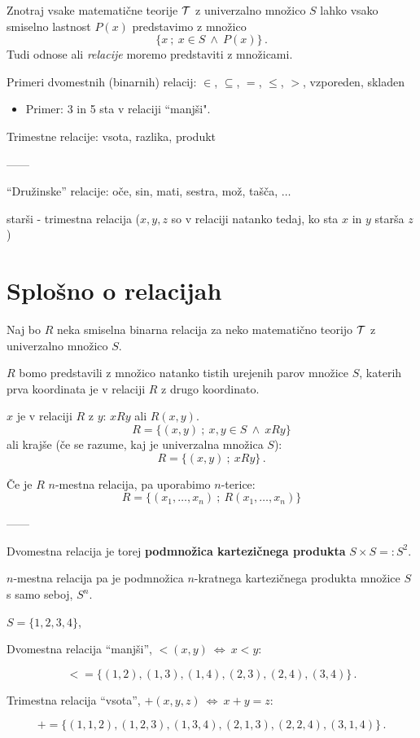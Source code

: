 \documentclass[11pt,paper=b5,footinclude,headinclude]{scrbook} %
\newcounter{example}
\def\inn {{~\wedge~}}
\def\cee {{~\Leftrightarrow~}}
\begin{document}
Znotraj vsake matematične teorije ${\cal T}$ z univerzalno množico $S$
lahko vsako smiselno lastnost $P(x)$ predstavimo z množico
$$\{x~;~x\in S\inn P(x)\}\,.$$
Tudi odnose ali {\em relacije} moremo predstaviti z množicami.

\medskip
Primeri dvomestnih (binarnih) relacij: $\in$, $\subseteq$, $=$, $\le$, $>$, vzporeden, skladen
\begin{itemize}
          \item Primer: 3 in 5 sta v relaciji ``manjši".
\end{itemize}
Trimestne relacije: vsota, razlika, produkt

------

``Družinske'' relacije: oče, sin, mati, sestra, mož, tašča, $\ldots$

starši - trimestna relacija ($x,y,z$ so v relaciji natanko tedaj, ko sta $x$ in $y$ starša $z$)

\section{Splošno o relacijah}

Naj bo $R$ neka smiselna binarna relacija za neko matematično teorijo ${\cal T}$ z univerzalno množico $S$.

$R$ bomo predstavili z množico natanko tistih urejenih parov množice $S$,
katerih prva koordinata je v relaciji $R$ z drugo koordinato.

$x$ je v relaciji $R$ z $y$: $xRy$ ali $R(x,y)$.
$$R = \{(x,y)~;~x,y\in S\inn xRy\}$$
ali krajše (če se razume, kaj je univerzalna množica $S$):
$$R = \{(x,y)~;~xRy\}\,.$$

\medskip
Če je $R$ $n$-mestna relacija, pa uporabimo $n$-terice:
$$R = \{(x_1,\ldots, x_n)~;~R(x_1,\ldots, x_n)\}$$

------

Dvomestna relacija je torej \textbf{ podmnožica kartezičnega produkta} $S\times S =: S^2$.

$n$-mestna relacija pa je podmnožica $n$-kratnega kartezičnega produkta množice $S$ s samo seboj, $S^n$.


\bigskip
\begin{example*}

$S = \{1,2,3,4\}$,

Dvomestna relacija ``manjši'', $<(x,y) \cee x<y$:

$$< = \{(1,2),(1,3),(1,4), (2,3), (2,4), (3,4)\}\,.$$

Trimestna relacija ``vsota'', $+(x,y,z) \cee x+y = z$:

$$+ = \{(1,1,2),(1,2,3),(1,3,4), (2,1,3), (2,2,4), (3,1,4)\}\,.$$
\end{example*}
\end{document}
